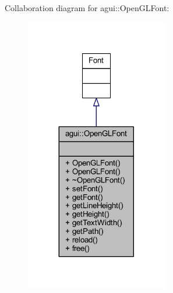 Collaboration diagram for agui\+:\+:Open\+G\+L\+Font\+:
\nopagebreak
\begin{figure}[H]
\begin{center}
\leavevmode
\includegraphics[width=176pt]{classagui_1_1_open_g_l_font__coll__graph}
\end{center}
\end{figure}
